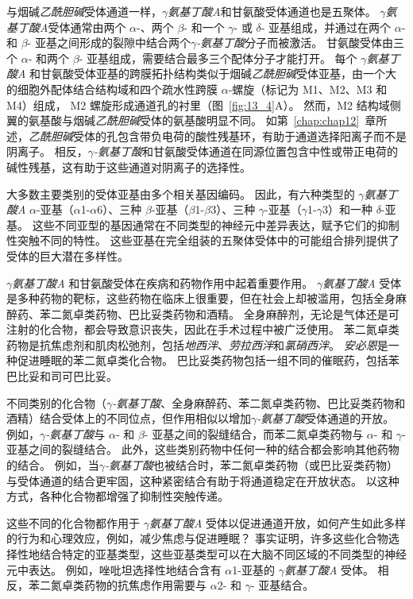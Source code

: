 与烟碱\textit{乙酰胆碱}受体通道一样，\textit{$\gamma$氨基丁酸A}和甘氨酸受体通道也是五聚体。
\textit{$\gamma$氨基丁酸A}受体通常由两个 $\alpha$-、两个 $\beta$- 和一个 $\gamma$- 或 $\delta$- 亚基组成，并通过在两个 $\alpha$- 和 $\beta$- 亚基之间形成的裂隙中结合两个\textit{$\gamma$-氨基丁酸}分子而被激活。
甘氨酸受体由三个 $\alpha$- 和两个 $\beta$- 亚基组成，需要结合最多三个配体分子才能打开。
每个 \textit{$\gamma$氨基丁酸A} 和甘氨酸受体亚基的跨膜拓扑结构类似于烟碱\textit{乙酰胆碱}受体亚基，由一个大的细胞外配体结合结构域和四个疏水性跨膜 $\alpha$-螺旋（标记为 M1、M2、M3 和 M4）组成， M2 螺旋形成通道孔的衬里（图~\ref{fig:13_4}A）。
然而，M2 结构域侧翼的氨基酸与烟碱\textit{乙酰胆碱}受体的氨基酸明显不同。
如第~\ref{chap:chap12}~章所述，\textit{乙酰胆碱}受体的孔包含带负电荷的酸性残基环，有助于通道选择阳离子而不是阴离子。
相反，\textit{$\gamma$-氨基丁酸}和甘氨酸受体通道在同源位置包含中性或带正电荷的碱性残基，这有助于这些通道对阴离子的选择性。


大多数主要类别的受体亚基由多个相关基因编码。
因此，有六种类型的 \textit{$\gamma$氨基丁酸A} $\alpha$-亚基（$\alpha$1-$\alpha$6）、三种 $\beta$-亚基（$\beta$1-$\beta$3）、三种 $\gamma$-亚基（$\gamma$1-$\gamma$3）和一种 $\delta$-亚基。
这些不同亚型的基因通常在不同类型的神经元中差异表达，赋予它们的抑制性突触不同的特性。
这些亚基在完全组装的五聚体受体中的可能组合排列提供了受体的巨大潜在多样性。


\textit{$\gamma$氨基丁酸A} 和甘氨酸受体在疾病和药物作用中起着重要作用。
\textit{$\gamma$氨基丁酸A} 受体是多种药物的靶标，这些药物在临床上很重要，但在社会上却被滥用，包括全身麻醉药、苯二氮卓类药物、巴比妥类药物和酒精。
全身麻醉剂，无论是气体还是可注射的化合物，都会导致意识丧失，因此在手术过程中被广泛使用。
苯二氮卓类药物是抗焦虑剂和肌肉松弛剂，包括\textit{地西泮}、\textit{劳拉西泮}和\textit{氯硝西泮}。
\textit{安必恩}是一种促进睡眠的苯二氮卓类化合物。
巴比妥类药物包括一组不同的催眠药，包括苯巴比妥和司可巴比妥。


不同类别的化合物（\textit{$\gamma$-氨基丁酸}、全身麻醉药、苯二氮卓类药物、巴比妥类药物和酒精）结合受体上的不同位点，但作用相似以增加\textit{$\gamma$-氨基丁酸}受体通道的开放。
例如，\textit{$\gamma$-氨基丁酸}与 $\alpha$- 和 $\beta$- 亚基之间的裂缝结合，而苯二氮卓类药物与 $\alpha$- 和 $\gamma$- 亚基之间的裂缝结合。
此外，这些类别药物中任何一种的结合都会影响其他药物的结合。
例如，当\textit{$\gamma$-氨基丁酸}也被结合时，苯二氮卓类药物（或巴比妥类药物）与受体通道的结合更牢固，这种紧密结合有助于将通道稳定在开放状态。
以这种方式，各种化合物都增强了抑制性突触传递。


这些不同的化合物都作用于 \textit{$\gamma$氨基丁酸A} 受体以促进通道开放，如何产生如此多样的行为和心理效应，例如，减少焦虑与促进睡眠？
事实证明，许多这些化合物选择性地结合特定的亚基类型，这些亚基类型可以在大脑不同区域的不同类型的神经元中表达。
例如，唑吡坦选择性地结合含有 $\alpha$1-亚基的 \textit{$\gamma$氨基丁酸A} 受体。
相反，苯二氮卓类药物的抗焦虑作用需要与 $\alpha$2- 和 $\gamma$- 亚基结合。


